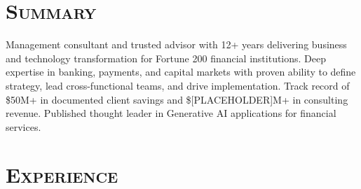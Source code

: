 \documentclass[11pt,a4paper]{moderncv}
\begin{document}
\makecvtitle
\vspace{-40pt}

\section{\textsc{Summary}}
\vspace{-5pt}
Management consultant and trusted advisor with 12+ years delivering business and technology transformation for Fortune 200 financial institutions. Deep expertise in banking, payments, and capital markets with proven ability to define strategy, lead cross-functional teams, and drive implementation. Track record of \$50M+ in documented client savings and \$[PLACEHOLDER]M+ in consulting revenue. Published thought leader in Generative AI applications for financial services.

\section{\textsc{Experience}}
\end{document}
